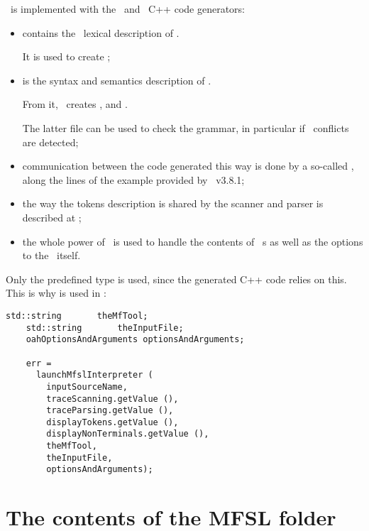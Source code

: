 \mfslLang\ is implemented with the \flex\ and \bison\ C++ code generators:
\begin{itemize}
\item {} contains the \flex\ lexical description of \mfslLang.

It is used to create ;

\item {} is the syntax and semantics description of \mfslLang.

From it, \bison\ creates ,  and .

The latter file can be used to check the grammar, in particular if \LR\ conflicts are detected;

\item communication between the code generated this way is done by a so-called , along the lines of the  example provided by \bison\ v3.8.1;

\item the way the tokens description is shared by the scanner and parser is described at ;

\item the whole power of \oahRepr\ is used to handle the contents of \mfslLang\ \script s as well as the options to the \mfslInterp\ itself.
\end{itemize}

Only the predefined  type is used, since the generated C++ code relies on this. This is why  is used in :
\begin{lstlisting}[language=CPlusPlus]
    std::string       theMfTool;
    std::string       theInputFile;
    oahOptionsAndArguments optionsAndArguments;

    err =
      launchMfslInterpreter (
        inputSourceName,
        traceScanning.getValue (),
        traceParsing.getValue (),
        displayTokens.getValue (),
        displayNonTerminals.getValue (),
        theMfTool,
        theInputFile,
        optionsAndArguments);
\end{lstlisting}


\section{The contents of the MFSL folder}

